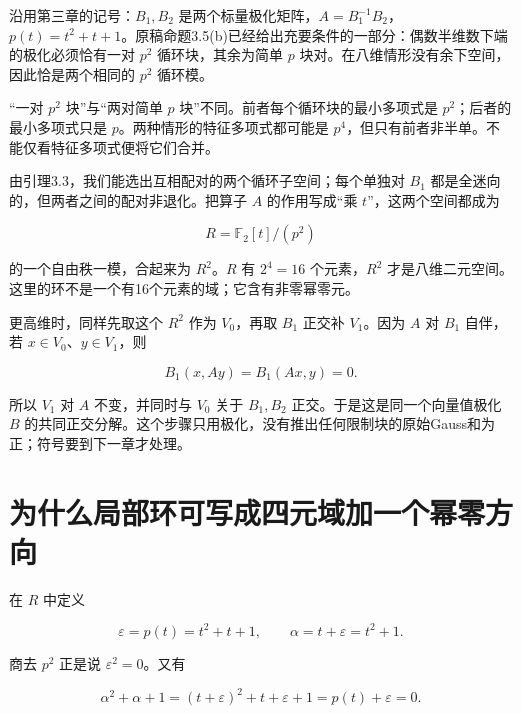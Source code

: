 \documentclass[UTF8,fontset=fandol,zihao=-4,openany,oneside]{ctexbook}
\begin{document}
沿用第三章的记号：\(B_1,B_2\) 是两个标量极化矩阵，\(A=B_1^{-1}B_2\)，\(p(t)=t^2+t+1\)。原稿命题3.5(b)已经给出充要条件的一部分：偶数半维数下端的极化必须恰有一对 \(p^2\) 循环块，其余为简单 \(p\) 块对。在八维情形没有余下空间，因此恰是两个相同的 \(p^2\) 循环模。



“一对 \(p^2\) 块”与“两对简单 \(p\) 块”不同。前者每个循环块的最小多项式是 \(p^2\)；后者的最小多项式只是 \(p\)。两种情形的特征多项式都可能是 \(p^4\)，但只有前者非半单。不能仅看特征多项式便将它们合并。



由引理3.3，我们能选出互相配对的两个循环子空间；每个单独对 \(B_1\) 都是全迷向的，但两者之间的配对非退化。把算子 \(A\) 的作用写成“乘 \(t\)”，这两个空间都成为



\[
R=\mathbb F_2[t]/(p^2)
\]



的一个自由秩一模，合起来为 \(R^2\)。\(R\) 有 \(2^4=16\) 个元素，\(R^2\) 才是八维二元空间。这里的环不是一个有16个元素的域；它含有非零幂零元。



更高维时，同样先取这个 \(R^2\) 作为 \(V_0\)，再取 \(B_1\) 正交补 \(V_1\)。因为 \(A\) 对 \(B_1\) 自伴，若 \(x\in V_0\)、\(y\in V_1\)，则



\[
B_1(x,Ay)=B_1(Ax,y)=0.
\]



所以 \(V_1\) 对 \(A\) 不变，并同时与 \(V_0\) 关于 \(B_1,B_2\) 正交。于是这是同一个向量值极化 \(B\) 的共同正交分解。这个步骤只用极化，没有推出任何限制块的原始Gauss和为正；符号要到下一章才处理。



\section{为什么局部环可写成四元域加一个幂零方向}


在 \(R\) 中定义



\[
\varepsilon=p(t)=t^2+t+1,\qquad \alpha=t+\varepsilon=t^2+1.
\]



商去 \(p^2\) 正是说 \(\varepsilon^2=0\)。又有



\[
\alpha^2+\alpha+1
=(t+\varepsilon)^2+t+\varepsilon+1
=p(t)+\varepsilon=0.
\]
\end{document}
